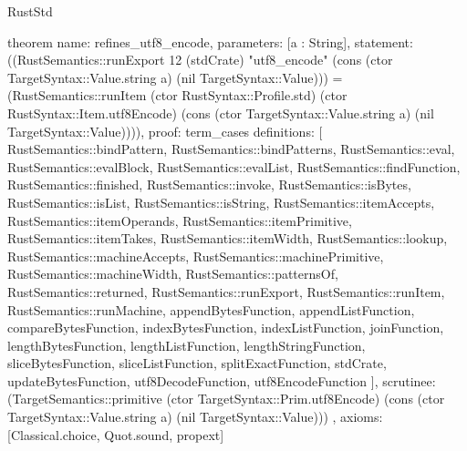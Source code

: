 \begin{lexlean}{RustStd}
\begin{semanticmodule}
theorem{
  name: refines_utf8_encode,
  parameters: [a : String],
  statement: ((RustSemantics::runExport 12 (stdCrate) "utf8_encode" (cons (ctor TargetSyntax::Value.string a) (nil TargetSyntax::Value))) = (RustSemantics::runItem (ctor RustSyntax::Profile.std) (ctor RustSyntax::Item.utf8Encode) (cons (ctor TargetSyntax::Value.string a) (nil TargetSyntax::Value)))),
  proof: term_cases{
    definitions: [
      RustSemantics::bindPattern,
      RustSemantics::bindPatterns,
      RustSemantics::eval,
      RustSemantics::evalBlock,
      RustSemantics::evalList,
      RustSemantics::findFunction,
      RustSemantics::finished,
      RustSemantics::invoke,
      RustSemantics::isBytes,
      RustSemantics::isList,
      RustSemantics::isString,
      RustSemantics::itemAccepts,
      RustSemantics::itemOperands,
      RustSemantics::itemPrimitive,
      RustSemantics::itemTakes,
      RustSemantics::itemWidth,
      RustSemantics::lookup,
      RustSemantics::machineAccepts,
      RustSemantics::machinePrimitive,
      RustSemantics::machineWidth,
      RustSemantics::patternsOf,
      RustSemantics::returned,
      RustSemantics::runExport,
      RustSemantics::runItem,
      RustSemantics::runMachine,
      appendBytesFunction,
      appendListFunction,
      compareBytesFunction,
      indexBytesFunction,
      indexListFunction,
      joinFunction,
      lengthBytesFunction,
      lengthListFunction,
      lengthStringFunction,
      sliceBytesFunction,
      sliceListFunction,
      splitExactFunction,
      stdCrate,
      updateBytesFunction,
      utf8DecodeFunction,
      utf8EncodeFunction
    ],
    scrutinee: (TargetSemantics::primitive (ctor TargetSyntax::Prim.utf8Encode) (cons (ctor TargetSyntax::Value.string a) (nil TargetSyntax::Value)))
  },
  axioms: [Classical.choice, Quot.sound, propext]
}


\end{semanticmodule}
\end{lexlean}
